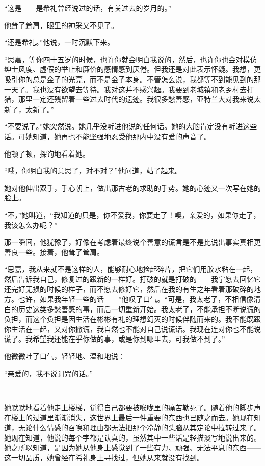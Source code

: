 \par “这是——是希礼曾经说过的话，有关过去的岁月的。”
\par 他耸了耸肩，眼里的神采又不见了。
\par “还是希礼。”他说，一时沉默下来。
\par “思嘉，等你四十五岁的时候，也许你就会明白我说的，然后，也许你也会对模仿绅士风度、虚假的举止和廉价的感情感到厌倦。但我还是对此表示怀疑。我想，更吸引你的总是金子的光亮，而不是金子本身。不管怎么说，我都等不到能见到的那一天了。我也没有欲望去等待。我对这并不感兴趣。我要到老城镇和老乡村去打猎，那里一定还残留着一些过去时代的遗迹。我很多愁善感，亚特兰大对我来说太新了，太新了。”
\par “不要说了。”她突然说。她几乎没听进他说的任何话。她的大脑肯定没有听进这些话。可她知道，她再也不能坚强地忍受他那内中没有爱的声音了。
\par 他顿了顿，探询地看着她。
\par “哦，你明白我的意思了，对不对？”他问道，站了起来。
\par 她对他伸出双手，手心朝上，做出那古老的求助的手势。她的心迹又一次写在她的脸上。
\par “不，”她叫道，“我知道的只是，你不爱我，你要走了！噢，亲爱的，如果你走了，我该怎么办呢？”
\par 那一瞬间，他犹豫了，好像在考虑着最终说个善意的谎言是不是比说出事实真相更善良一些。接着，他耸了耸肩。
\par “思嘉，我从来就不是这样的人，能够耐心地捡起碎片，把它们用胶水粘在一起，然后告诉我自己，修复过的跟新的一样好。打破的就是打破的——我宁愿去回忆它还完好无损的时候的样子，而不愿去修好它，然后在我的有生之年看着那破碎的地方。也许，如果我年轻一些的话——”他叹了口气。“可是，我太老了，不相信像清白的历史这类多愁善感的事，而后一切重新开始。我太老了，不能承担不断说谎的负担，而这个负担是因生活在彬彬有礼的理想幻灭的时候伴随而来的。我不能既跟你生活在一起，又对你撒谎，我自然也不能对自己说谎话。我现在连对你也不能说谎了。我希望我还能在乎你做的事，或是你到哪里去，可我做不到了。”
\par 他微微吐了口气，轻轻地、温和地说：
\par “亲爱的，我不说诅咒的话。”
\par  
\par 她默默地看着他走上楼梯，觉得自己都要被喉咙里的痛苦勒死了。随着他的脚步声在楼上的过道里渐渐消失，这世界上最后一件重要的东西也已随之而去。她现在知道，无论什么情感的召唤和理由都无法把那个冷静的头脑从其定论中拉转过来了。她现在知道，他说的每个字都是认真的，虽然其中一些话是轻描淡写地说出来的。她之所以知道，是因为她从他身上感觉到了一些有力、顽强、无法平息的东西——这一切品质，她曾经在希礼身上寻找过，但她从来就没有找到。
